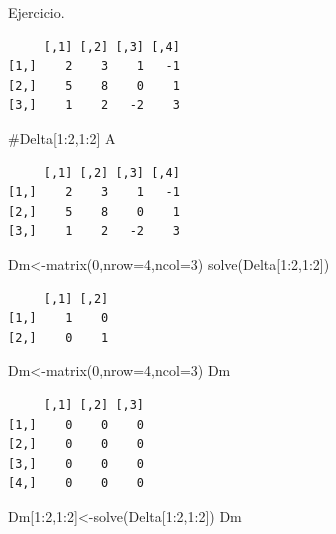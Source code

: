 \documentclass[
  ignorenonframetext,
  aspectratio=169,
  spanish,
]{beamer}
\newenvironment{Shaded}{\begin{snugshade}}{\end{snugshade}}
\newcommand{\AttributeTok}[1]{\textcolor[rgb]{0.40,0.45,0.13}{#1}}
\newcommand{\CommentTok}[1]{\textcolor[rgb]{0.37,0.37,0.37}{#1}}
\newcommand{\DecValTok}[1]{\textcolor[rgb]{0.68,0.00,0.00}{#1}}
\newcommand{\FunctionTok}[1]{\textcolor[rgb]{0.28,0.35,0.67}{#1}}
\newcommand{\NormalTok}[1]{\textcolor[rgb]{0.00,0.23,0.31}{#1}}
\newcommand{\OtherTok}[1]{\textcolor[rgb]{0.00,0.23,0.31}{#1}}
\newcommand{\SpecialCharTok}[1]{\textcolor[rgb]{0.37,0.37,0.37}{#1}}
\begin{document}
\begin{frame}[fragile]{}
\begin{block}{Ejercicio.}
\begin{verbatim}
     [,1] [,2] [,3] [,4]
[1,]    2    3    1   -1
[2,]    5    8    0    1
[3,]    1    2   -2    3
\end{verbatim}

\begin{Shaded}
\begin{Highlighting}[]
\CommentTok{\#Delta[1:2,1:2]}
\NormalTok{A}
\end{Highlighting}
\end{Shaded}

\begin{verbatim}
     [,1] [,2] [,3] [,4]
[1,]    2    3    1   -1
[2,]    5    8    0    1
[3,]    1    2   -2    3
\end{verbatim}

\begin{Shaded}
\begin{Highlighting}[]
\NormalTok{Dm}\OtherTok{\textless{}{-}}\FunctionTok{matrix}\NormalTok{(}\DecValTok{0}\NormalTok{,}\AttributeTok{nrow=}\DecValTok{4}\NormalTok{,}\AttributeTok{ncol=}\DecValTok{3}\NormalTok{)}
\FunctionTok{solve}\NormalTok{(Delta[}\DecValTok{1}\SpecialCharTok{:}\DecValTok{2}\NormalTok{,}\DecValTok{1}\SpecialCharTok{:}\DecValTok{2}\NormalTok{])}
\end{Highlighting}
\end{Shaded}

\begin{verbatim}
     [,1] [,2]
[1,]    1    0
[2,]    0    1
\end{verbatim}

\begin{Shaded}
\begin{Highlighting}[]
\NormalTok{Dm}\OtherTok{\textless{}{-}}\FunctionTok{matrix}\NormalTok{(}\DecValTok{0}\NormalTok{,}\AttributeTok{nrow=}\DecValTok{4}\NormalTok{,}\AttributeTok{ncol=}\DecValTok{3}\NormalTok{)}
\NormalTok{Dm}
\end{Highlighting}
\end{Shaded}

\begin{verbatim}
     [,1] [,2] [,3]
[1,]    0    0    0
[2,]    0    0    0
[3,]    0    0    0
[4,]    0    0    0
\end{verbatim}

\begin{Shaded}
\begin{Highlighting}[]
\NormalTok{Dm[}\DecValTok{1}\SpecialCharTok{:}\DecValTok{2}\NormalTok{,}\DecValTok{1}\SpecialCharTok{:}\DecValTok{2}\NormalTok{]}\OtherTok{\textless{}{-}}\FunctionTok{solve}\NormalTok{(Delta[}\DecValTok{1}\SpecialCharTok{:}\DecValTok{2}\NormalTok{,}\DecValTok{1}\SpecialCharTok{:}\DecValTok{2}\NormalTok{])}
\NormalTok{Dm}
\end{Highlighting}
\end{Shaded}


\end{block}
\end{frame}
\end{document}
